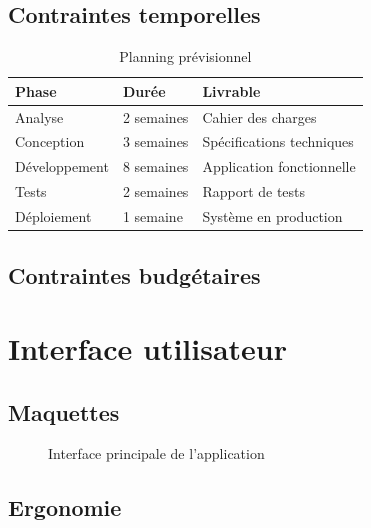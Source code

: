 \documentclass[12pt,a4paper]{article}
\begin{document}
\subsection{Contraintes temporelles}

\lipsum[11]

\begin{table}[h]
\centering
\begin{tabular}{|l|l|l|}
\hline
\textbf{Phase} & \textbf{Durée} & \textbf{Livrable} \\
\hline
Analyse & 2 semaines & Cahier des charges \\
\hline
Conception & 3 semaines & Spécifications techniques \\
\hline
Développement & 8 semaines & Application fonctionnelle \\
\hline
Tests & 2 semaines & Rapport de tests \\
\hline
Déploiement & 1 semaine & Système en production \\
\hline
\end{tabular}
\caption{Planning prévisionnel}
\end{table}

\subsection{Contraintes budgétaires}

\lipsum[12]

\section{Interface utilisateur}

\subsection{Maquettes}

\lipsum[13]

\begin{figure}[h]
\centering
{}
\caption{Interface principale de l'application}
\end{figure}

\subsection{Ergonomie}

\lipsum[14]

\end{document}
